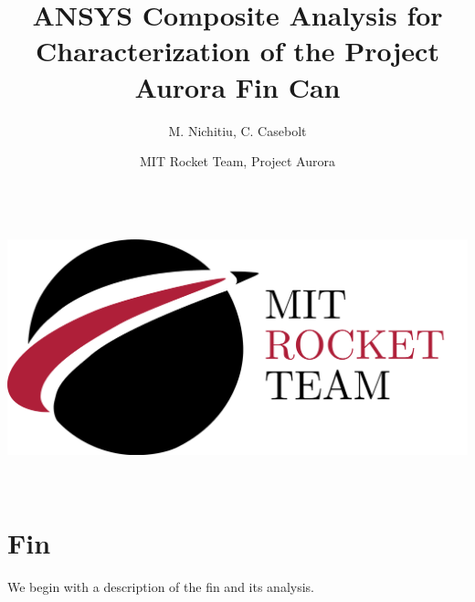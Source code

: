 \documentclass{amsdtx}
\title{\kern-2.4cm\sc ANSYS Composite Analysis for Characterization of the  Project Aurora Fin Can}
\author{\sc M. Nichitiu, C. Casebolt}
\date{\sc MIT Rocket Team, Project Aurora}
\begin{document}
\begin{multicols}{2}
 \maketitle
\begin{center}
	~~~~~~~~~~~~~~~~~~\includegraphics[scale=0.1]{rtlogo.pdf}
\end{center}
\end{multicols}
~\\
\section{Fin}
We begin with a description of the fin and its analysis. 
\end{document}
